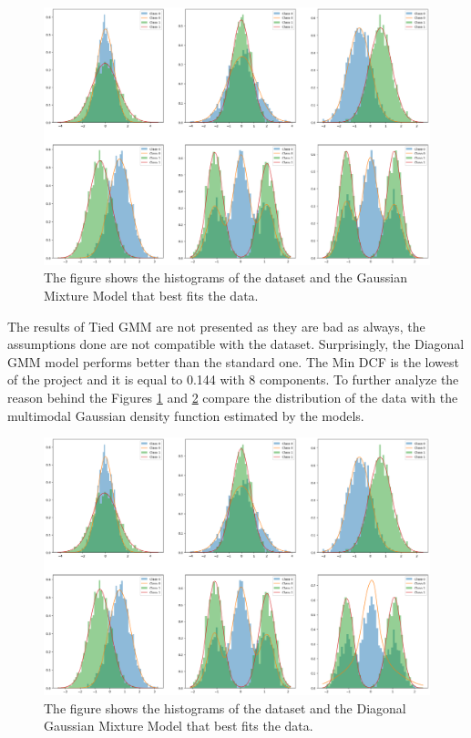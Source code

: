 \documentclass{article}
\begin{document}
\begin{figure}[ht]
    \centering
    \includegraphics[width=\textwidth]{images/dataset_gmm.png}
    \caption{The figure shows the histograms of the dataset and the Gaussian Mixture Model that best fits the data.}
    \label{fig:dataset_gmm}
\end{figure}

The results of Tied GMM are not presented as they are bad as always, the assumptions done are not compatible with the dataset. Surprisingly, the Diagonal GMM model performs better than the standard one. The Min DCF is the lowest of the project and it is equal to 0.144 with 8 components. To further analyze the reason behind the Figures \ref{fig:dataset_gmm} and \ref{fig:dataset_gmm_diagonal} compare the distribution of the data with the multimodal Gaussian density function estimated by the models.

\begin{figure}[ht]
    \centering
    \includegraphics[width=\textwidth]{images/dataset_gmm_diagonal.png}
    \caption{The figure shows the histograms of the dataset and the Diagonal Gaussian Mixture Model that best fits the data.}
    \label{fig:dataset_gmm_diagonal}
\end{figure}
\end{document}
